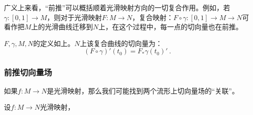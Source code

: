 广义上来看，“前推”可以概括顺着光滑映射方向的一切复合作用。例如，若$\gamma:[0,1]\rightarrow M$，则对于光滑映射$F:M\rightarrow N$，复合映射：$F\circ \gamma:[0,1]\rightarrow M\rightarrow N$可看作把$M$上的光滑曲线迁移到$N$上，在这个过程中，每一点的切向量也在前推。
\begin{lemma}{}
$F,\gamma,M,N$的定义如上。$N$上该复合曲线的切向量为：
\begin{equation}
(F\circ\gamma)'(t_0)=F_*\gamma(t_0)'~.
\end{equation}
\end{lemma}
\subsubsection{前推切向量场}
如果$f:M\rightarrow N$是光滑映射，那么我们可能找到两个流形上切向量场的“关联”。
\begin{definition}{}
设$f:M\rightarrow N$光滑映射，
\end{definition}